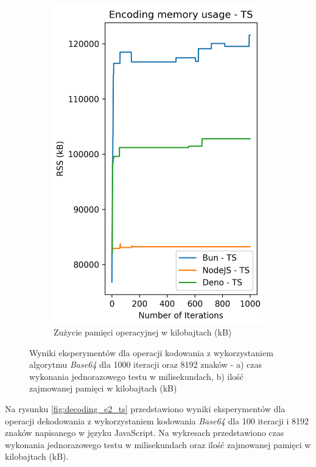 \begin{figure}[H]
\begin{subfigure}[b]{0.42\textwidth}
    \includegraphics[width=\textwidth]{Figures/coding/base64_1000_encoding_ts_memory.png}
    \caption{Zużycie pamięci operacyjnej w kilobajtach (kB)}
    \label{fig:encoding_e2_ts_memory}
  \end{subfigure}
  \hfill
  \caption{Wyniki eksperymentów dla operacji kodowania z wykorzystaniem algorytmu \textit{Base64} dla 1000 iteracji oraz 8192 znaków - a) czas wykonania jednorazowego testu w milisekundach, b) ilość zajmowanej pamięci w kilobajtach (kB)}
  \label{fig:encoding_e2_ts}
\end{figure}

Na rysunku \ref{fig:decoding_e2_ts} przedstawiono wyniki eksperymentów dla operacji dekodowania z wykorzystaniem kodowania \textit{Base64} dla 100 iteracji i 8192 znaków napisanego w języku JavaScript. Na wykresach przedstawiono czas wykonania jednorazowego testu w milisekundach oraz ilość zajmowanej pamięci w kilobajtach (kB).

